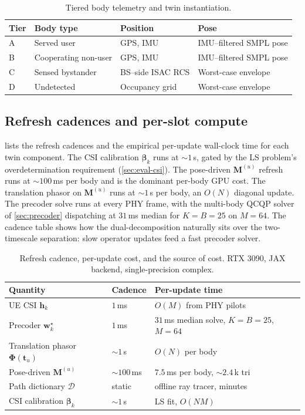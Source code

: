 \documentclass[journal,twocolumn,10pt]{IEEEtran}
\theoremstyle{plain}
\theoremstyle{remark}
\newcommand{\hh}{\mathbf{h}}
\newcommand{\ww}{\mathbf{w}}
\newcommand{\Mmat}{\mathbf{M}}
\newcommand{\Phimat}{\mathbf{\Phi}}
\newcommand{\Dict}{\mathcal{D}}
\begin{document}
\begin{table}[!t]
\caption{Tiered body telemetry and twin instantiation.}
\label{tab:tiers}
\centering
\small
\begin{tabular}{@{}p{}p{}p{}p{}@{}}
\toprule
Tier & Body type & Position & Pose \\
\midrule
A & Served user & GPS, IMU & IMU--filtered SMPL pose \\
B & Cooperating non-user & GPS, IMU & IMU--filtered SMPL pose \\
C & Sensed bystander & BS--side ISAC RCS & Worst-case envelope \\
D & Undetected & Occupancy grid & Worst-case envelope \\
\bottomrule
\end{tabular}
\end{table}

\subsection{Refresh cadences and per-slot compute}\label{sec:cadence}

 lists the refresh cadences and the empirical
per-update wall-clock time for each twin component. The CSI
calibration $\bm\beta_k$ runs at $\sim 1\,$s, gated by the LS
problem's overdetermination requirement (\cref{sec:eval-csi}). The
pose-driven $\Mmat^{(u)}$ refresh runs at $\sim 100\,$ms per body
and is the dominant per-body GPU cost. The translation phasor on
$\Mmat^{(u)}$ runs at $\sim 1\,$s per body, an $O(N)$ diagonal
update. The precoder solve runs at every PHY frame, with the
multi-body QCQP solver of \cref{sec:precoder} dispatching at
$31\,$ms median for $K = B = 25$ on $M = 64$. The cadence table
shows how the dual-decomposition naturally sits over the
two-timescale separation: slow operator updates feed a fast
precoder solver.

\begin{table}[!t]
\caption{Refresh cadence, per-update cost, and the source of cost.
RTX 3090, JAX backend, single-precision complex.}
\label{tab:cadence}
\centering
\small
\begin{tabular}{@{}p{}p{}p{}@{}}
\toprule
Quantity & Cadence & Per-update time \\
\midrule
UE CSI $\hh_k$ & $1\,$ms & $O(M)$ from PHY pilots \\
Precoder $\ww_k^\star$ & $1\,$ms & $31\,$ms median solve, $K = B = 25$, $M = 64$ \\
Translation phasor $\Phimat(\mathbf{t}_u)$ & $\sim 1\,$s & $O(N)$ per body \\
Pose-driven $\Mmat^{(u)}$ & $\sim 100\,$ms & $7.5\,$ms per body, $\sim 2.4$\,k tri \\
Path dictionary $\Dict$ & static & offline ray tracer, minutes \\
CSI calibration $\bm\beta_k$ & $\sim 1\,$s & LS fit, $O(N M)$ \\
\bottomrule
\end{tabular}
\end{table}
\end{document}

